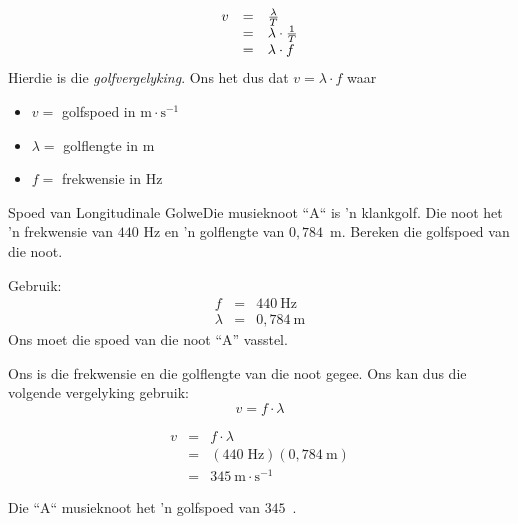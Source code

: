     \begin{equation}
    \begin{array}{ccc}\hfill v& =& \frac{\lambda }{T}\hfill \\ & =& \lambda \ensuremath{\cdot}\frac{1}{T}\hfill \\ & =& \lambda \ensuremath{\cdot}f\hfill \end{array}
      \end{equation}
        \label{m38806*id319870}Hierdie is die \textsl{golfvergelyking}. Ons het dus dat $v=\lambda \ensuremath{\cdot}f$ waar\par 
        \label{m38806*id319901}\begin{itemize}[noitemsep]
            \label{m38806*uid22}\item $v=$ golfspoed in $\text{m}\ensuremath{\cdot}\text{s}{}^{-1}$\label{m38806*uid23}\item $\lambda =$ golflengte in $\text{m}$
\item $f=$ frekwensie in $\text{Hz}$
\end{itemize}
\par

\begin{wex}
{Spoed van Longitudinale Golwe}{Die musieknoot ``A`` is  'n klankgolf. Die noot het  'n frekwensie van $440$ Hz en  'n golflengte van $0,784$~m. Bereken die golfspoed van die noot.}{
Gebruik:
\begin{eqnarray*}
f &=& 440 \ \text{Hz} \\
\lambda &=& 0,784\ \text{m}
\end{eqnarray*}
Ons moet die spoed van die noot ``A'' vasstel.

Ons is die frekwensie en die golflengte van die noot gegee. Ons kan dus die volgende vergelyking gebruik:
\begin{equation*}
v=f\cdot \lambda 
\end{equation*}

\begin{eqnarray*}
v&=&f\cdot \lambda\\
&=&(440\;\text{Hz})(0,784~\text{m})\\
&=&345~\text{m}\cdot\text{s}^{-1}
\end{eqnarray*}

Die ``A`` musieknoot het  'n golfspoed van $345$~\ms.
}
\end{wex}

